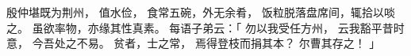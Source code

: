 
\switchcolumn*[\section{}]

殷仲堪既为荆州，
值水俭，
食常五碗，外无余肴，
饭粒脱落盘席间，辄拾以啖之。
虽欲率物，亦缘其性真素。
每语子弟云：「
    勿以我受任方州，
    云我豁平昔时意，
    今吾处之不易。
    贫者，士之常，
    焉得登枝而捐其本？
    尔曹其存之！
」

\switchcolumn



